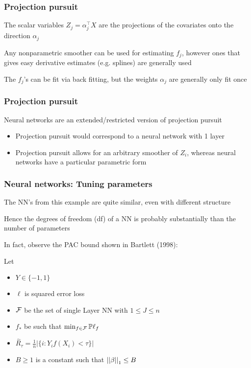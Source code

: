 \documentclass[12pt]{beamer}
\begin{document}
\begin{frame}[fragile]
\frametitle{Projection pursuit}
The scalar variables $Z_j = \alpha_j^{\top} X$ are the projections of the covariates onto the direction $\alpha_j$


Any nonparametric smoother can be used for estimating $f_j$, however ones that gives easy derivative estimates (e.g. splines)
are generally used

\vsp
The $f_j$'s can be fit via back fitting, but the weights $\alpha_j$ are generally only fit once

\end{frame}

\begin{frame}[fragile]
\frametitle{Projection pursuit}
Neural networks are an extended/restricted version of projection pursuit

\begin{itemize}
\item {} Projection pursuit would correspond to a neural network with 1 layer
\item {} Projection pursuit allows for an arbitrary smoother of $Z_i$, whereas neural networks have a
particular parametric form
\end{itemize}
\end{frame}


\begin{frame}[fragile]
\frametitle{Neural networks: Tuning parameters}
The  NN's from this example are quite similar, even with  different structure
\vsp

Hence the degrees of freedom (df) of a NN is probably substantially  than the number of parameters
\vsp

In fact, observe the PAC bound shown in Bartlett (1998):
\vsp

Let 
\begin{itemize}
\item $Y \in \{-1,1\}$
\item $\ell$ is squared error loss
\item $\mathcal{F}$ be the set of single Layer NN with $1\leq J\leq n$
\item $f_*$ be such that $\min_{f \in \mathcal{F}} \mathbb{P} \ell_f$
\item $\hat R_\tau = \frac{1}{n} |\{i: Y_i f(X_i) < \tau\}|$

\item $B \geq 1$ is a constant such that $\left|\left| \beta \right|\right|_1 \leq B$
\end{itemize}

\end{frame}
\end{document}
